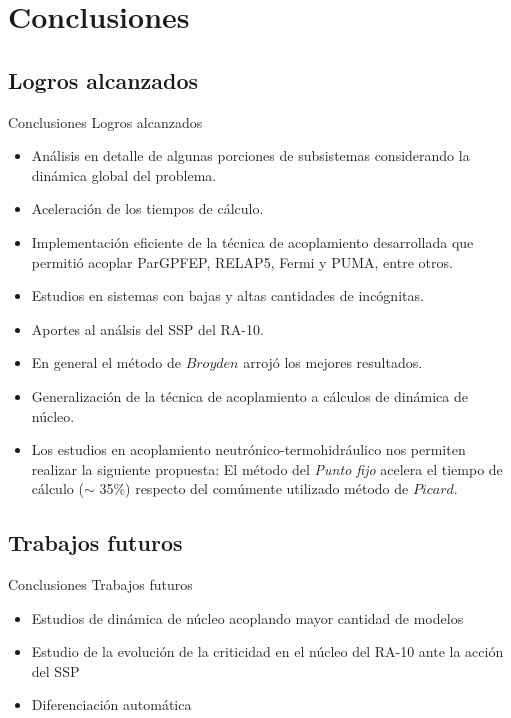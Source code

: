 \section{Conclusiones}

\subsection*{Logros alcanzados}
\normalsize
\begin{frame}
{Conclusiones}
{Logros alcanzados}

\begin{itemize}
\item <2-> Análisis en detalle de algunas porciones de subsistemas considerando la dinámica global del problema.
\item <3-> Aceleración de los tiempos de cálculo.
\item <4-> Implementación eficiente de la técnica de acoplamiento desarrollada que permitió acoplar ParGPFEP, RELAP5, Fermi y PUMA, entre otros.
\item <5-> Estudios en sistemas con bajas y altas cantidades de incógnitas.
\item <6-> Aportes al análsis del SSP del RA-10.
\item <7-> En general el método de $Broyden$ arrojó los mejores resultados.
\item <8-> Generalización de la técnica de acoplamiento a cálculos de dinámica de núcleo.
\item <9-> Los estudios en acoplamiento neutrónico-termohidráulico nos permiten realizar la siguiente propuesta: 
El método del \textit{Punto fijo} acelera el tiempo de cálculo ($\sim$ 35\%) respecto del comúmente utilizado método de $Picard$.
\end{itemize}

\end{frame}

\subsection*{Trabajos futuros}

\begin{frame}
{Conclusiones}
{Trabajos futuros}

\begin{itemize}
\item <2-> Estudios de dinámica de núcleo acoplando mayor cantidad de modelos
\item <3-> Estudio de la evolución de la criticidad en el núcleo del RA-10 ante la acción del SSP
\item <4-> Diferenciación automática
\end{itemize}

\end{frame}

